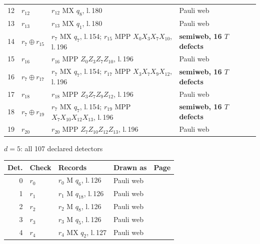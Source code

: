 \documentclass[11pt]{article}
\begin{document}
\begin{semiwebaddition}
{\begin{longtable}{rp{.3\linewidth}p{.43\linewidth}lr}
12 & $r_{12}$ & $r_{12}$ MX $q_{8}$, l.\,180 & Pauli web & \hyperref[d3_det012]{\pageref*{d3_det012}}\\
13 & $r_{13}$ & $r_{13}$ MX $q_{1}$, l.\,180 & Pauli web & \hyperref[d3_det013]{\pageref*{d3_det013}}\\
14 & $r_{7}\oplus r_{15}$ & $r_{7}$ MX $q_{7}$, l.\,154; $r_{15}$ MPP $X_{0}X_{3}X_{7}X_{10}$, l.\,196 & \textbf{semiweb, 16 $T$ defects} & \hyperref[d3_det014]{\pageref*{d3_det014}}\\
15 & $r_{16}$ & $r_{16}$ MPP $Z_{0}Z_{3}Z_{7}Z_{10}$, l.\,196 & Pauli web & \hyperref[d3_det015]{\pageref*{d3_det015}}\\
16 & $r_{7}\oplus r_{17}$ & $r_{7}$ MX $q_{7}$, l.\,154; $r_{17}$ MPP $X_{3}X_{7}X_{9}X_{12}$, l.\,196 & \textbf{semiweb, 16 $T$ defects} & \hyperref[d3_det016]{\pageref*{d3_det016}}\\
17 & $r_{18}$ & $r_{18}$ MPP $Z_{3}Z_{7}Z_{9}Z_{12}$, l.\,196 & Pauli web & \hyperref[d3_det017]{\pageref*{d3_det017}}\\
18 & $r_{7}\oplus r_{19}$ & $r_{7}$ MX $q_{7}$, l.\,154; $r_{19}$ MPP $X_{7}X_{10}X_{12}X_{13}$, l.\,196 & \textbf{semiweb, 16 $T$ defects} & \hyperref[d3_det018]{\pageref*{d3_det018}}\\
19 & $r_{20}$ & $r_{20}$ MPP $Z_{7}Z_{10}Z_{12}Z_{13}$, l.\,196 & Pauli web & \hyperref[d3_det019]{\pageref*{d3_det019}}\\
\bottomrule
\end{longtable}}
\newpage
{}
{\Large $d=5$: all 107 declared detectors}\par\medskip
{\small\setlength{\LTleft}{0pt}\setlength{\LTright}{\fill}
\begin{longtable}{rp{.3\linewidth}p{.43\linewidth}lr}
\toprule
Det. & Check & Records & Drawn as & Page\\
\midrule
\endhead
0 & $r_{0}$ & $r_{0}$ M $q_{6}$, l.\,126 & Pauli web & \hyperref[d5_det000]{\pageref*{d5_det000}}\\
1 & $r_{1}$ & $r_{1}$ M $q_{18}$, l.\,126 & Pauli web & \hyperref[d5_det001]{\pageref*{d5_det001}}\\
2 & $r_{2}$ & $r_{2}$ M $q_{8}$, l.\,126 & Pauli web & \hyperref[d5_det002]{\pageref*{d5_det002}}\\
3 & $r_{3}$ & $r_{3}$ M $q_{5}$, l.\,126 & Pauli web & \hyperref[d5_det003]{\pageref*{d5_det003}}\\
4 & $r_{4}$ & $r_{4}$ MX $q_{2}$, l.\,127 & Pauli web & \hyperref[d5_det004]{\pageref*{d5_det004}}\\

\end{longtable}}
\end{semiwebaddition}
\end{document}
